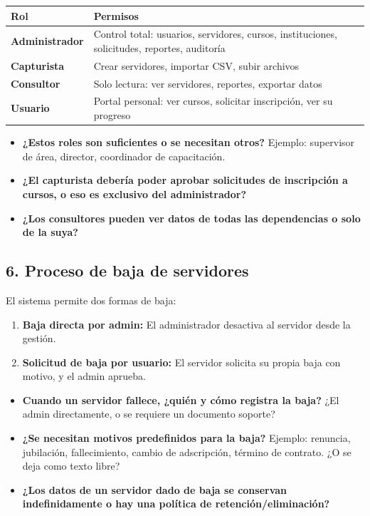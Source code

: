 \documentclass[12pt,letterpaper]{article}
\begin{document}
\begin{center}
\begin{tabular}{>{\bfseries}l p{10cm}}
\toprule
\textbf{Rol} & \textbf{Permisos} \\
\midrule
Administrador & Control total: usuarios, servidores, cursos, instituciones, solicitudes, reportes, auditoría \\
Capturista & Crear servidores, importar CSV, subir archivos \\
Consultor & Solo lectura: ver servidores, reportes, exportar datos \\
Usuario & Portal personal: ver cursos, solicitar inscripción, ver su progreso \\
\bottomrule
\end{tabular}
\end{center}

\vspace{8pt}

\begin{itemize}
\item \textbf{¿Estos roles son suficientes o se necesitan otros?} Ejemplo: supervisor de área, director, coordinador de capacitación.

\item \textbf{¿El capturista debería poder aprobar solicitudes de inscripción a cursos, o eso es exclusivo del administrador?}

\item \textbf{¿Los consultores pueden ver datos de todas las dependencias o solo de la suya?}
\end{itemize}

\subsection{6. Proceso de baja de servidores}

El sistema permite dos formas de baja:

\begin{enumerate}[leftmargin=2em]
\item \textbf{Baja directa por admin:} El administrador desactiva al servidor desde la gestión.
\item \textbf{Solicitud de baja por usuario:} El servidor solicita su propia baja con motivo, y el admin aprueba.
\end{enumerate}

\begin{itemize}
\item \textbf{Cuando un servidor fallece, ¿quién y cómo registra la baja?} ¿El admin directamente, o se requiere un documento soporte?

\item \textbf{¿Se necesitan motivos predefinidos para la baja?} Ejemplo: renuncia, jubilación, fallecimiento, cambio de adscripción, término de contrato. ¿O se deja como texto libre?

\item \textbf{¿Los datos de un servidor dado de baja se conservan indefinidamente o hay una política de retención/eliminación?}
\end{itemize}
\end{document}

